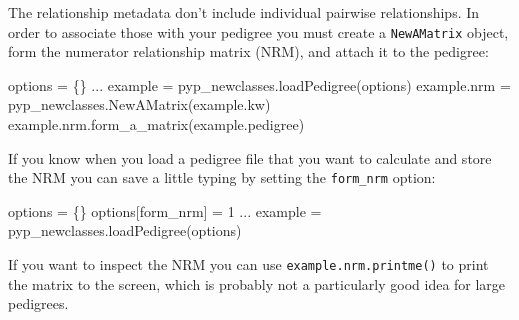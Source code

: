 \documentclass[
  letterpaper,
  DIV=11,
  numbers=noendperiod]{scrreprt}
\newenvironment{Shaded}{\begin{snugshade}}{\end{snugshade}}
\newcommand{\DecValTok}[1]{\textcolor[rgb]{0.68,0.00,0.00}{#1}}
\newcommand{\NormalTok}[1]{\textcolor[rgb]{0.00,0.23,0.31}{#1}}
\newcommand{\OperatorTok}[1]{\textcolor[rgb]{0.37,0.37,0.37}{#1}}
\newcommand{\StringTok}[1]{\textcolor[rgb]{0.13,0.47,0.30}{#1}}
\begin{document}
The relationship metadata don't include individual pairwise
relationships. In order to associate those with your pedigree you must
create a \texttt{NewAMatrix} object, form the numerator relationship
matrix (NRM), and attach it to the pedigree:

\begin{Shaded}
\begin{Highlighting}[]
\NormalTok{options }\OperatorTok{=}\NormalTok{ \{\}}
\NormalTok{...}
\NormalTok{example }\OperatorTok{=}\NormalTok{ pyp\_newclasses.loadPedigree(options)}
\NormalTok{example.nrm }\OperatorTok{=}\NormalTok{ pyp\_newclasses.NewAMatrix(example.kw)}
\NormalTok{example.nrm.form\_a\_matrix(example.pedigree)}
\end{Highlighting}
\end{Shaded}

If you know when you load a pedigree file that you want to calculate and
store the NRM you can save a little typing by setting the
\texttt{form\_nrm} option:

\begin{Shaded}
\begin{Highlighting}[]
\NormalTok{options }\OperatorTok{=}\NormalTok{ \{\}}
\NormalTok{options[}\StringTok{\textquotesingle{}form\_nrm\textquotesingle{}}\NormalTok{] }\OperatorTok{=} \DecValTok{1}
\NormalTok{...}
\NormalTok{example }\OperatorTok{=}\NormalTok{ pyp\_newclasses.loadPedigree(options)}
\end{Highlighting}
\end{Shaded}

If you want to inspect the NRM you can use
\texttt{example.nrm.printme()} to print the matrix to the screen, which
is probably not a particularly good idea for large pedigrees.
\end{document}
